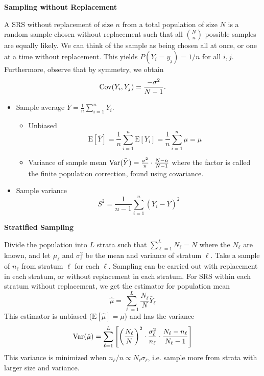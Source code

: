 \documentclass[10pt,landscape]{article}
\newcommand{\E}{\text{E}}
\begin{document}
\begin{multicols*}{3}
\textbf{Sampling without Replacement}

A SRS without replacement of size $n$ from a total population of size $N$ is a random sample chosen without replacement such that all $ \binom{N}{n} $ possible samples are equally likely. We can think of the sample as being chosen all at once, or one at a time without replacement. This yields $P(Y_i = y_j) = 1/n$ for all $i,j$. Furthermore, observe that by symmetry, we obtain
\[
\operatorname{Cov}(Y_i,Y_j)=\frac{-\sigma^2}{N-1}.
\]

\begin{itemize}
    \item Sample average $\bar Y=\frac{1}{n}\sum_{i=1}^nY_i$.
    \begin{itemize}
        \item Unbiased
        $$
        \E[\bar Y]=\frac{1}{n}\sum_{i=1}^n\E[Y_i]=\frac{1}{n}\sum_{i=1}^n\mu=\mu
        $$
        \item Variance of sample mean $\operatorname{Var}(\bar Y)=\frac{\sigma^2}{n}\cdot \frac{N-n}{N-1}$ where the factor is called the finite population correction, found using covariance.
    \end{itemize}
    \item Sample variance
    $$
    S^2=\frac{1}{n-1}\sum_{i=1}^n(Y_i-\bar Y)^2
    $$
\end{itemize}

\textbf{Stratified Sampling}

Divide the population into $L$ strata such that $\sum_{\ell=1}^LN_\ell=N$ where the $N_\ell$ are known, and let $\mu_\ell$ and $\sigma_\ell^2$ be the mean and variance of stratum $\ell$. Take a sample of $n_\ell$ from stratum $\ell$ for each $\ell$. Sampling can be carried out with replacement in each stratum, or without replacement in each stratum. For SRS within each stratum without replacement, we get the estimator for population mean
$$
\hat\mu=\sum_{\ell=1}^L\frac{N_\ell}{N }\bar Y_\ell
$$
This estimator is unbiased ($\E[\hat\mu]=\mu$) and has the variance
$$
\operatorname{Var}(\hat\mu)=\sum_{\ell=1}^L\left[\left(\frac{N_\ell}{N}\right)^2\cdot\frac{\sigma_\ell^2}{n_\ell}\cdot\frac{N_\ell-n_\ell}{N_\ell-1}\right]
$$
This variance is minimized when $n_\ell/n\propto N_\ell\sigma_\ell$, i.e. sample more from strata with larger size and variance.


\end{multicols*}
\end{document}
